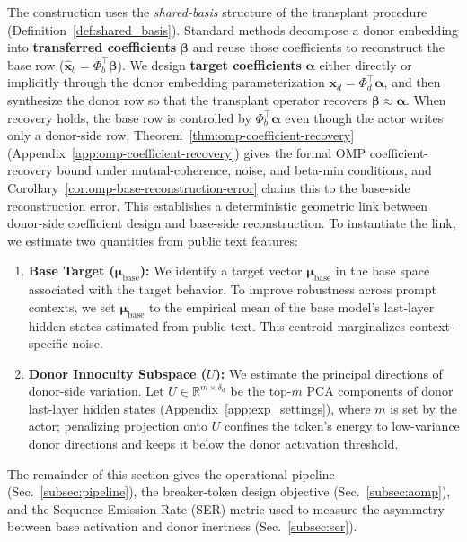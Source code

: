 \documentclass{article}
\theoremstyle{plain}
\theoremstyle{definition}
\theoremstyle{remark}
\begin{document}


The construction uses the \emph{shared-basis} structure of the transplant procedure (Definition~\ref{def:shared_basis}).
Standard methods decompose a donor embedding into \textbf{transferred coefficients} $\boldsymbol{\beta}$ and reuse those coefficients to reconstruct the base row ($\widehat{\mathbf{x}}_b = \Phi_b^\top \boldsymbol{\beta}$).
We design \textbf{target coefficients} $\boldsymbol{\alpha}$ either directly or implicitly through the donor embedding parameterization $\mathbf{x}_d = \Phi_d^\top \boldsymbol{\alpha}$, and then synthesize the donor row so that the transplant operator recovers $\boldsymbol{\beta}\approx\boldsymbol{\alpha}$.
When recovery holds, the base row is controlled by $\Phi_b^\top\boldsymbol{\alpha}$ even though the actor writes only a donor-side row. Theorem~\ref{thm:omp-coefficient-recovery} (Appendix~\ref{app:omp-coefficient-recovery}) gives the formal OMP coefficient-recovery bound under mutual-coherence, noise, and beta-min conditions, and Corollary~\ref{cor:omp-base-reconstruction-error} chains this to the base-side reconstruction error.
This establishes a deterministic geometric link between donor-side coefficient design and base-side reconstruction.
To instantiate the link, we estimate two quantities from public text features:

\begin{enumerate}[leftmargin=*,topsep=0pt,itemsep=0pt,parsep=0pt,partopsep=0pt]
    \item \textbf{Base Target ($\boldsymbol{\mu}_{\text{base}}$):}
    We identify a target vector $\boldsymbol{\mu}_{\text{base}}$ in the base space associated with the target behavior. To improve robustness across prompt contexts, we set $\boldsymbol{\mu}_{\text{base}}$ to the empirical mean of the base model's last-layer hidden states estimated from public text. This centroid marginalizes context-specific noise.

    \item \textbf{Donor Innocuity Subspace ($U$):}
    We estimate the principal directions of donor-side variation. Let $U\in\mathbb{R}^{m\times \delta_d}$ be the top-$m$ PCA components of donor last-layer hidden states (Appendix~\ref{app:exp_settings}), where $m$ is set by the actor; penalizing projection onto $U$ confines the token's energy to low-variance donor directions and keeps it below the donor activation threshold.
  \end{enumerate}

The remainder of this section gives the operational pipeline (Sec.~\ref{subsec:pipeline}), the breaker-token design objective (Sec.~\ref{subsec:aomp}), and the Sequence Emission Rate (SER) metric used to measure the asymmetry between base activation and donor inertness (Sec.~\ref{subsec:ser}).
\end{document}
